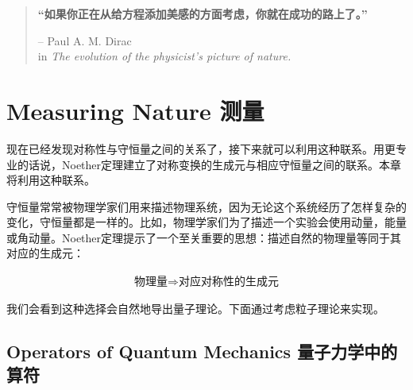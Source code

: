 


\begin{quote}%
{\bf “如果你正在从给方程添加美感的方面考虑，你就在成功的路上了。”}


\begin{flushright}
-- Paul A. M. Dirac\\
in {\it The evolution of the
physicist's picture of nature.}
\end{flushright}
\end{quote}

\chapter[测量]{Measuring Nature 测量}\label{chap5}

现在已经发现对称性与守恒量之间的关系了，接下来就可以利用这种联系。用更专业的话说，Noether定理建立了对称变换的生成元与相应守恒量之间的联系。本章将利用这种联系。

守恒量常常被物理学家们用来描述物理系统，因为无论这个系统经历了怎样复杂的变化，守恒量都是一样的。比如，物理学家们为了描述一个实验会使用动量，能量或角动量。Noether定理提示了一个至关重要的思想：描述自然的物理量等同于其对应的生成元：

\begin{align}\label{equ5.1}
\text{物理量}\Rightarrow\text{对应对称性的生成元}
\end{align}

我们会看到这种选择会自然地导出量子理论。下面通过考虑粒子理论来实现。

\section[量子力学中的算符]{Operators of Quantum Mechanics 量子力学中的算符}\label{sec5.1}


